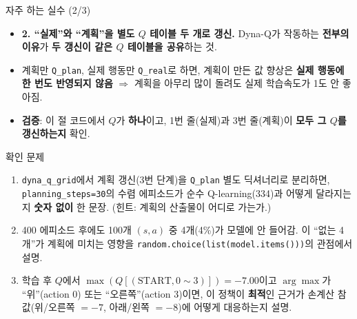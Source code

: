 \documentclass[aspectratio=169,11pt]{beamer}
\begin{document}
\begin{frame}{자주 하는 실수 (2/3)}
  \begin{itemize}
    \item \textbf{2. ``실제''와 ``계획''을 \textbf{별도 $Q$ 테이블 두
      개}로 갱신.}
      Dyna-Q가 작동하는 \textbf{전부의 이유}가 \textbf{두 갱신이
      같은 $Q$ 테이블을 공유}하는 것.
    \item 계획만 \texttt{Q\_plan}, 실제 행동만 \texttt{Q\_real}로
      하면, 계획이 만든 값 향상은 \textbf{실제 행동에 한 번도
      반영되지 않음} $\Rightarrow$ 계획을 아무리 많이 돌려도
      실제 학습속도가 1도 안 좋아짐.
    \item \textbf{검증}: 이 절 코드에서 $Q$가 \textbf{하나}이고,
      1번 줄(실제)과 3번 줄(계획)이 \textbf{모두 그 $Q$를
      갱신하는지} 확인.
  \end{itemize}
\end{frame}


\begin{frame}{확인 문제}
  \begin{enumerate}
    \item {} \texttt{dyna\_q\_grid}에서 계획 갱신(3번
      단계)을 \texttt{Q\_plan} 별도 딕셔너리로 분리하면,
      \texttt{planning\_steps=30}의 수렴 에피소드가 순수
      Q-learning(334)과 어떻게 달라지는지 \textbf{숫자 없이}
      한 문장. (힌트: 계획의 산출물이 어디로 가는가.)
    \item {} 400 에피소드 후에도 100개 $(s,a)$ 중
      4개(4\%)가 모델에 안 들어감. 이 ``없는 4개''가 계획에
      미치는 영향을 \texttt{random.choice(list(model.items()))}의
      관점에서 설명.
    \item {} 학습 후 $Q$에서
      $\max(Q[(\text{START}, 0\sim3)]) = -7.00$이고
      $\arg\max$가 ``위''(action 0) 또는 ``오른쪽''(action 3)이면,
      이 정책이 \textbf{최적}인 근거가 손계산 참값(위/오른쪽 $=-7$,
      아래/왼쪽 $=-8$)에 어떻게 대응하는지 설명.
  \end{enumerate}
\end{frame}
\end{document}

